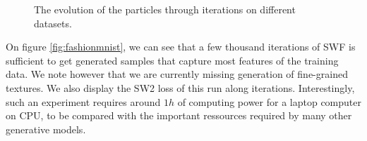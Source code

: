 \begin{figure}
\centering
{}\hfill
{}
\caption{The evolution of the particles through iterations on different datasets.}
\end{figure}



On figure \ref{fig:fashionmnist}, we can see that a few thousand iterations of SWF is sufficient to get generated samples that capture most features of the training data. We note however that we are currently missing generation of fine-grained textures. We also display the SW2 loss of this run along iterations. Interestingly, such an experiment requires around $1h$ of computing power for a laptop computer on CPU, to be compared with the important ressources required by many other generative models.




